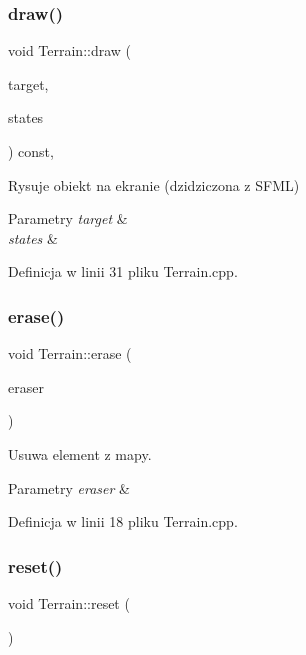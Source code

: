 \subsubsection{\texorpdfstring{draw()}{draw()}}
{\footnotesize\ttfamily void Terrain\+::draw (\begin{DoxyParamCaption}\item[{sf\+::\+Render\+Target \&}]{target,  }\item[{sf\+::\+Render\+States}]{states }\end{DoxyParamCaption}) const\hspace{0.3cm}{\ttfamily [override]}, {\ttfamily [protected]}}



Rysuje obiekt na ekranie (dzidziczona z S\+F\+ML) 


\begin{DoxyParams}{Parametry}
{\em target} & \\
\hline
{\em states} & \\
\hline
\end{DoxyParams}


Definicja w linii 31 pliku Terrain.\+cpp.

\mbox{\label{class_terrain_a552c55d3ce93ae1c8988432acdf7aea1}} 
\subsubsection{\texorpdfstring{erase()}{erase()}}
{\footnotesize\ttfamily void Terrain\+::erase (\begin{DoxyParamCaption}\item[{const sf\+::\+Drawable \&}]{eraser }\end{DoxyParamCaption})}



Usuwa element z mapy. 


\begin{DoxyParams}{Parametry}
{\em eraser} & \\
\hline
\end{DoxyParams}


Definicja w linii 18 pliku Terrain.\+cpp.

\mbox{\label{class_terrain_a009d97df85f0704ad9ea3c61fcd11080}} 
\subsubsection{\texorpdfstring{reset()}{reset()}}
{\footnotesize\ttfamily void Terrain\+::reset (\begin{DoxyParamCaption}{ }\end{DoxyParamCaption})}



